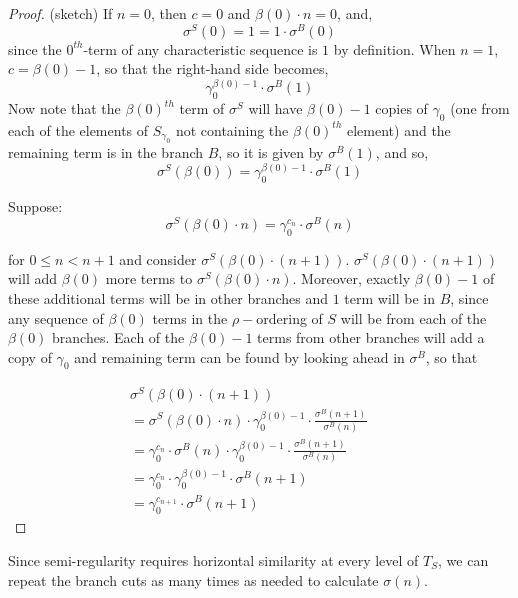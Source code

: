 \begin{proof}
(sketch)
If $n=0$, then $c=0$ and $\beta(0) \cdot n = 0$, and,
\[\sigma^S(0)= 1 =	1 \cdot \sigma^{B}(0)\]
since the $0^{th}$-term of any characteristic sequence is $1$ by definition. When $n=1$, $c=\beta(0)-1$, so that the right-hand side becomes,
\[\gamma_0^{\beta(0)-1} \cdot \sigma^{B}(1)\]
Now note that the $\beta(0)^{th}$ term of $\sigma^S$ will have $\beta(0)-1$ copies of $\gamma_0$ (one from each of the elements of $S_{\gamma_0}$ not containing the $\beta(0)^{th}$ element) and the remaining term is in the branch $B$, so it is given by $\sigma^B(1)$, and so,
\[\sigma^S(\beta(0))=\gamma_0^{\beta(0)-1} \cdot \sigma^{B}(1)\]


Suppose:
\[\sigma^S(\beta(0) \cdot n)=\gamma_0^{c_n} \cdot \sigma^{B}(n)\]

for $0 \leq n < n +1$ and consider $\sigma^S(\beta(0) \cdot (n+1))$. $\sigma^S(\beta(0) \cdot (n+1))$ will add $\beta(0)$ more terms to $\sigma^S(\beta(0) \cdot n)$. Moreover, exactly $\beta(0)-1$ of these additional terms will be in other branches and $1$ term will be in $B$, since any sequence of $\beta(0)$ terms in the $\rho-$ordering of $S$ will be from each of the $\beta(0)$ branches. Each of the $\beta(0)-1$ terms from other branches will add a copy of $\gamma_0$ and remaining term can be found by looking ahead in $\sigma^B$, so that

\begin{align*}
\sigma^S(\beta(0) \cdot (n+1)) && \\
= \sigma^S(\beta(0) \cdot n) \cdot \gamma_0^{\beta(0)-1} \cdot \frac{\sigma^B(n+1)}{\sigma^B(n)} && \\
= {\gamma_0^{c_n}} \cdot \sigma^{B}(n) \cdot \gamma_0^{\beta(0)-1} \cdot  \frac{\sigma^B(n+1)}{\sigma^B(n)} &&\\
= {\gamma_0^{c_n}}  \cdot \gamma_0^{\beta(0)-1} \cdot  \sigma^B(n+1) && \\
= {\gamma_0^{c_{n+1}}} \cdot  \sigma^B(n+1) 
\end{align*}

\end{proof}
Since semi-regularity requires horizontal similarity at every level of $T_S$, we can repeat the branch cuts as many times as needed to calculate $\sigma(n)$.

